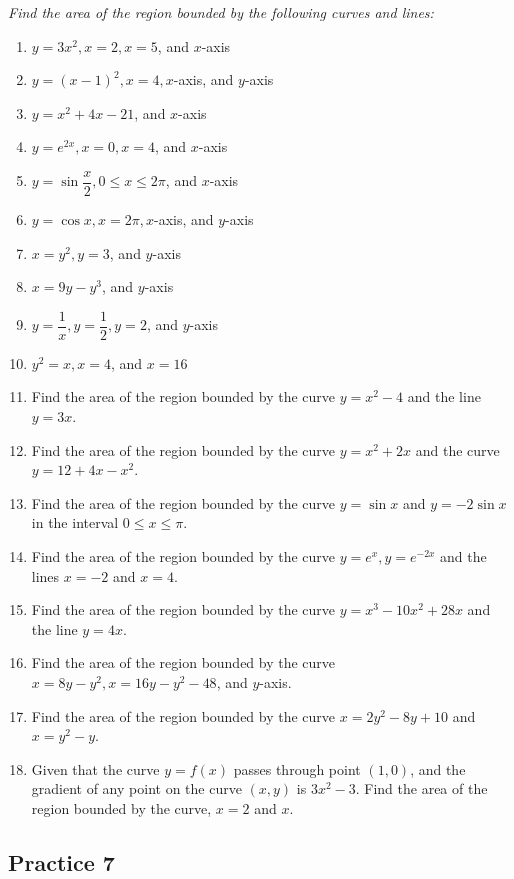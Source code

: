 \documentclass{report}
\begin{document}
\noindent \hspace{1.2em}\textit{Find the area of the region bounded by the following curves and lines:}
\begin{enumerate}
    \item $y=3 x^2, x=2, x=5$, and $x$-axis
    \item $y=(x-1)^2, x=4, x$-axis, and $y$-axis
    \item $y=x^2+4 x-21$, and $x$-axis
    \item $y=e^{2 x}, x=0, x=4$, and $x$-axis
    \item $y=\sin \dfrac{x}{2}, 0 \leq x \leq 2 \pi$, and $x$-axis
    \item $y=\cos x, x=2 \pi, x$-axis, and $y$-axis
    \item $x=y^2, y=3$, and $y$-axis
    \item $x=9 y-y^3$, and $y$-axis
    \item $y=\dfrac{1}{x}, y=\dfrac{1}{2}, y=2$, and $y$-axis
    \item $y^2=x, x=4$, and $x=16$
    \item Find the area of the region bounded by the curve $y=x^2-4$ and the line $y=3
              x$.
    \item Find the area of the region bounded by the curve $y=x^2+2 x$ and the curve
          $y=12+4 x-x^2$.
    \item Find the area of the region bounded by the curve $y=\sin x$ and $y=-2 \sin x$
          in the interval $0 \leq x \leq \pi$.
    \item Find the area of the region bounded by the curve $y=e^x, y=e^{-2 x}$ and the
          lines $x=-2$ and $x=4$.
    \item Find the area of the region bounded by the curve $y=x^3-10 x^2+28 x$ and the
          line $y=4 x$.
    \item Find the area of the region bounded by the curve $x=8 y-y^2, x=16 y-y^2-48$,
          and $y$-axis.
    \item Find the area of the region bounded by the curve $x=2 y^2-8 y+10$ and
          $x=y^2-y$.
    \item Given that the curve $y=f(x)$ passes through point $(1,0)$, and the gradient of
          any point on the curve $(x, y)$ is $3 x^2-3$. Find the area of the region
          bounded by the curve, $x=2$ and $x$.
\end{enumerate}

\subsection{Practice 7}
\end{document}
